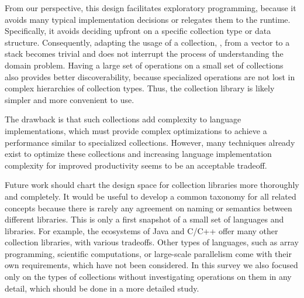 \documentclass[sigconf, authorversion]{acmart}
\begin{document}
From our perspective, this design facilitates exploratory programming,
because it avoids many typical implementation decisions or relegates them to the runtime.
Specifically, it avoids deciding upfront on a specific collection type
or data structure.
Consequently, adapting the usage of a collection,
\eg, from a vector to a stack becomes trivial
and does not interrupt the process of understanding the domain problem.
Having a large set of operations on a small set of collections also
provides better discoverability,
because specialized operations
are not lost in complex hierarchies of collection types.
Thus, the collection library is likely simpler and more convenient to use.

The drawback is that such collections
add complexity to language implementations,
which must provide complex optimizations
to achieve a performance similar to specialized collections.
However, many techniques already exist to optimize these collections
and increasing language implementation complexity for improved productivity
seems to be an acceptable tradeoff.

%


Future work should chart the design space for collection libraries more 
thoroughly and completely.
It would be useful to develop a common taxonomy for all related concepts
because there is rarely any agreement on naming or semantics between different
libraries.
This is only a first snapshot of a small set of languages and libraries.
For example, the ecosystems of Java and  C/C++
offer many other collection libraries,
with various tradeoffs.
Other types of languages, such as array programming,
scientific computations, or large-scale parallelism come with their own
requirements, which have not been considered.
In this survey we also focused only on the types of collections
without investigating operations on them in any detail,
which should be done in a more detailed study.
\end{document}
